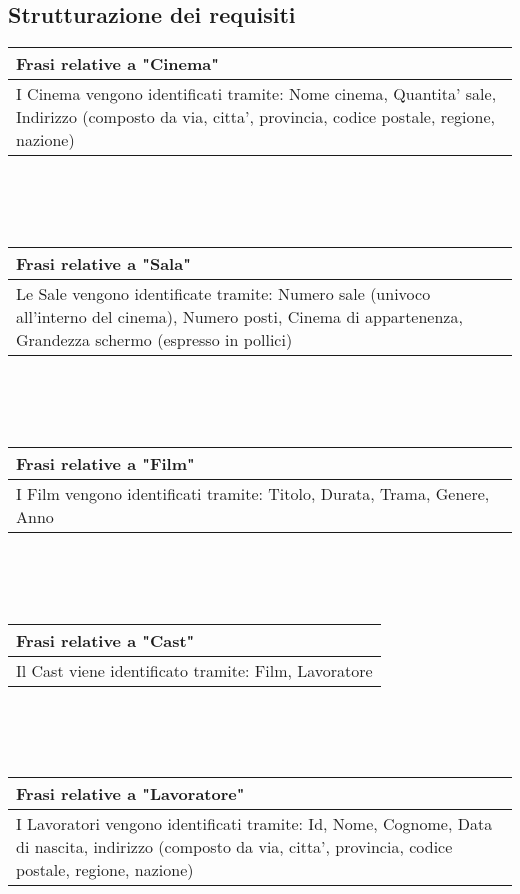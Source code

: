 \documentclass[10pt]{article}
\begin{document}
 	\subsection{Strutturazione dei requisiti}
	\begin{tabular} { |p{16.8cm}| }
 		\hline
 		\rowcolor{lightgray}
 		\textbf{Frasi relative a "Cinema"} \\
 		\hline
 		I Cinema vengono identificati tramite: Nome cinema, Quantita' sale, Indirizzo (composto da via, citta', provincia, codice postale, regione, nazione) \\
 		\hline 		
 	\end{tabular}
 	\\\\\\
	\begin{tabular} { |p{16.8cm}| }
	 	\hline
	 	\rowcolor{lightgray}
	 	\textbf{Frasi relative a "Sala"} \\
	 	\hline
	 	Le Sale vengono identificate tramite: Numero sale (univoco all'interno del cinema), Numero posti, Cinema di appartenenza, Grandezza schermo (espresso in pollici) \\
	 	\hline 		
	\end{tabular} 
	\\\\\\
	\begin{tabular} { |p{16.8cm}| }
		\hline
		\rowcolor{lightgray}
		\textbf{Frasi relative a "Film"} \\
		\hline
		I Film vengono identificati tramite: Titolo, Durata, Trama, Genere, Anno \\
		\hline 		
	\end{tabular} 
 	\\\\\\
 	\begin{tabular} { |p{16.8cm}| }
 		\hline
 		\rowcolor{lightgray}
 		\textbf{Frasi relative a "Cast"} \\
 		\hline
 		Il Cast viene identificato tramite: Film, Lavoratore \\
 		\hline 		
 	\end{tabular} 
 	\\\\\\
 	\begin{tabular} { |p{16.8cm}| }
 		\hline
 		\rowcolor{lightgray}
 		\textbf{Frasi relative a "Lavoratore"} \\
 		\hline
 		I Lavoratori vengono identificati tramite: Id, Nome, Cognome, Data di nascita, indirizzo (composto da via, citta', provincia, codice postale, regione, nazione) \\
 		\hline 		
 	\end{tabular} 
\end{document}
